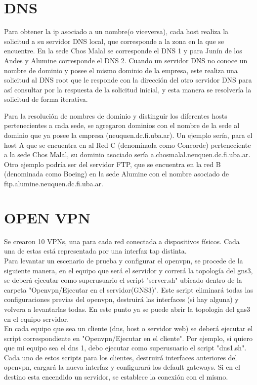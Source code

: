 \documentclass[12pt, a4paper, spanish]{article}
\begin{document}
\newpage


\newpage
\section{DNS}
Para obtener la ip asociado a un nombre(o viceversa), cada host realiza 
la solicitud a su servidor DNS local, que corresponde a la zona en la que 
se encuentre.
En la sede Chos Malal se corresponde el DNS 1 y para Junín de los Andes y 
Alumine corresponde el DNS 2.
Cuando un servidor DNS no conoce un nombre de dominio y posee el mismo 
dominio de la empresa, este realiza una solicitud al DNS root que le responde 
con la dirección del otro servidor DNS para así consultar por la respuesta de 
la solicitud inicial, y esta manera se resolvería la solicitud de forma 
iterativa.

Para la resolución de nombres de dominio y distinguir los diferentes hosts 
pertenecientes a cada sede, se agregaron dominios con el nombre de la sede 
al dominio que ya posee la empresa (neuquen.dc.fi.uba.ar).
Un ejemplo sería, para el host A que se encuentra en al Red C (denominada 
como Concorde) perteneciente a la sede Chos Malal, su dominio asociado sería 
a.chosmalal.neuquen.dc.fi.uba.ar.
Otro ejemplo podría ser del servidor FTP, que se encuentra en la red B 
(denominada como Boeing) en la sede Alumine con el nombre asociado de 
ftp.alumine.neuquen.dc.fi.uba.ar.

\section{OPEN VPN}
Se crearon 10 VPNs, una para cada red conectada a dispositivos físicos. Cada una de estas 
está representada por una interfaz tap distinta.\\
Para levantar un escenario de prueba y configurar el openvpn, se procede
de la siguiente manera, en el equipo que será el servidor y correrá la topología 
del gns3, se deberá ejecutar como superusuario el script "server.sh" ubicado dentro de la carpeta
"Openvpn/Ejecutar en el servidor(GNS3)". Este script eliminará todas las configuraciones
previas del openvpn, destruirá las interfaces (si hay alguna) y volvera a levantarlas todas.
En este punto ya se puede abrir la topologia del gns3 en el equipo servidor.\\
En cada equipo que sea un cliente (dns, host o servidor web) se deberá ejecutar el 
script correspondiente en "Openvpn/Ejecutar en el cliente". Por ejemplo, si quiero
que mi equipo sea el dns 1, debo ejecutar como superusuario el script "dns1.sh".\\
Cada uno de estos scripts para los clientes, destruirá interfaces anteriores del 
openvpn, cargará la nueva interfaz y configurará los default gateways. Si en el 
destino esta encendido un servidor, se establece la conexión con el mismo.
\end{document}
